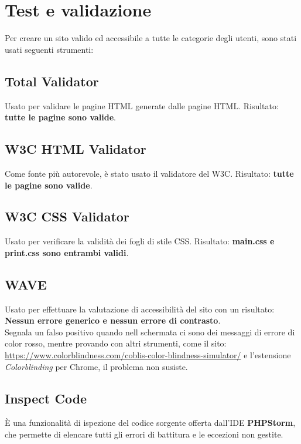 \documentclass[1_relazione.tex]{subfiles}
\begin{document}
    \section{Test e validazione}\label{sec:test-e-validazione}
    Per creare un sito valido ed accessibile a tutte le categorie degli utenti, sono stati usati seguenti strumenti:

    \subsection{Total Validator}
    Usato per validare le pagine HTML generate dalle pagine HTML.\newline
    Risultato: \textbf{tutte le pagine sono valide}.
    \subsection{W3C HTML Validator}
    Come fonte pi\`{u} autorevole, \`{e} stato usato il validatore del W3C.\newline
    Risultato: \textbf{tutte le pagine sono valide}.
    \subsection{W3C CSS Validator}
    Usato per verificare la validit\`{a} dei fogli di stile CSS. \newline
    Risultato: \textbf{main.css e print.css sono entrambi validi}.
    \subsection{WAVE}
    Usato per effettuare la valutazione di accessibilit\`{a} del sito con un risultato: \textbf{Nessun errore generico e nessun errore di contrasto}.
    \\Segnala un falso positivo quando nell schermata ci sono dei messaggi di errore di color rosso, mentre provando con altri strumenti, come il sito:\\ \url{https://www.colorblindness.com/coblis-color-blindness-simulator/}
    e l'estensione \textit{Colorblinding} per Chrome, il problema non susiste.
    
    \subsection{Inspect Code}
    \`{E} una funzionalit\`{a} di ispezione del codice sorgente offerta dall'IDE \textbf{PHPStorm}, che permette di elencare tutti gli errori di battitura e le eccezioni non gestite.
\end{document}
